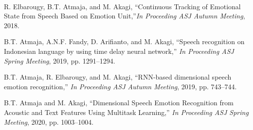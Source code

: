 \begin{publication}
\item[] \hspace{-1cm}{\LARGE\bf Domestic Conferences} \\ 
\item 
R. Elbarougy, B.T. Atmaja, and M. Akagi, ``Continuous Tracking of Emotional
State from Speech Based on Emotion Unit,''\textit{In Proceeding ASJ Autumn
Meeting}, 2018.

\item
B.T. Atmaja, A.N.F. Fandy, D. Arifianto, and M. Akagi, ``Speech recognition on
Indonesian language by using time delay neural network,'' \textit{In Proceeding
ASJ Spring Meeting}, 2019, pp. 1291--1294.

\item
B.T. Atmaja, R. Elbarougy, and M. Akagi, ``RNN-based dimensional speech emotion
recognition,'' \textit{In Proceeding ASJ Autumn Meeting}, 2019, pp. 743--744.

\item
B.T. Atmaja and M. Akagi, ``Dimensional Speech Emotion Recognition from
Acoustic and Text Features Using Multitask Learning,'' \textit{In Proceeding
ASJ Spring Meeting}, 2020, pp. 1003--1004.

\end{publication}
